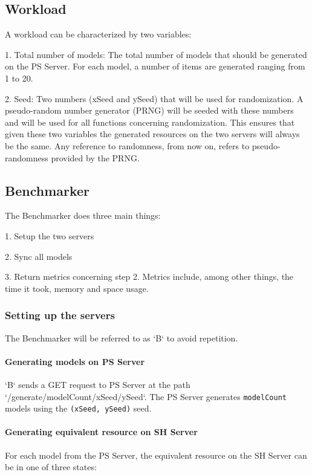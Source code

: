 \subsection{Workload}
A workload can be characterized by two variables:

1. Total number of models: The total number of models that should be generated on the PS Server. For each model, a number of items are generated ranging from 1 to 20.

2. Seed: Two numbers (xSeed and ySeed) that will be used for randomization. A pseudo-random number generator (PRNG) will be seeded with these numbers and will be used for all functions concerning randomization. This ensures that given these two variables the generated resources on the two servers will always be the same. Any reference to randomness, from now on, refers to pseudo-randomness provided by the PRNG.

\subsection{Benchmarker}

The Benchmarker does three main things:

1. Setup the two servers

2. Sync all models

3. Return metrics concerning step 2. Metrics include, among other things, the time it took, memory and space usage.


\subsubsection{Setting up the servers}
The Benchmarker will be referred to as `B` to avoid repetition.

\paragraph{Generating models on PS Server}
`B` sends a GET request to PS Server at the path `/generate/modelCount/xSeed/ySeed`. The PS Server generates \texttt{modelCount} models using the \texttt{(xSeed, ySeed)} seed.

\paragraph{Generating equivalent resource on SH Server}
For each model from the PS Server, the equivalent resource on the SH Server can be in one of three states:

